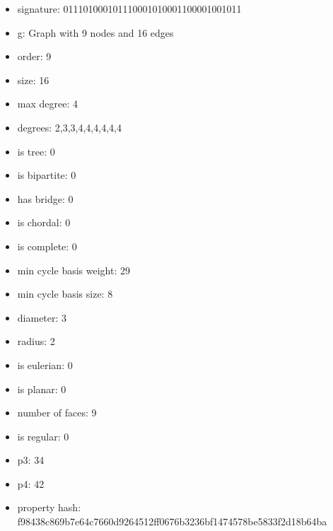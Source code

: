 \newpage
\begin{figure}
\end{figure}
\begin{itemize}
\item signature: 011101000101110001010001100001001011
\item g: Graph with 9 nodes and 16 edges
\item order: 9
\item size: 16
\item max degree: 4
\item degrees: 2,3,3,4,4,4,4,4,4
\item is tree: 0
\item is bipartite: 0
\item has bridge: 0
\item is chordal: 0
\item is complete: 0
\item min cycle basis weight: 29
\item min cycle basis size: 8
\item diameter: 3
\item radius: 2
\item is eulerian: 0
\item is planar: 0
\item number of faces: 9
\item is regular: 0
\item p3: 34
\item p4: 42
\item property hash: f98438c869b7e64c7660d9264512ff0676b3236bf1474578be5833f2d18b64ba
\end{itemize}
